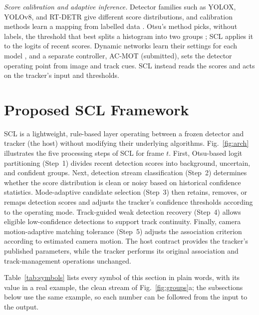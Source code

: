 \documentclass[pdflatex,sn-mathphys-num,iicol]{sn-jnl}
\newcommand{\scl}{SCL}
\begin{document}
\emph{Score calibration and adaptive inference.} Detector families such as YOLOX, YOLOv8, and RT-DETR give different score distributions,
and calibration methods learn a mapping from labelled data \cite{kuppers2020detcalib}. Otsu's
method picks, without labels, the threshold that best splits a histogram into two groups
\cite{otsu1979}; \scl{} applies it to the logits of recent scores. Dynamic networks learn their
settings for each model \cite{han2022dynamic}, and a separate controller, AC-MOT (submitted), sets the detector operating point from
image and track cues. \scl{} instead reads the scores and acts on the tracker's input and
thresholds.
\section{Proposed SCL Framework}\label{sec:method}

\scl{} is a lightweight, rule-based layer operating between a frozen detector and tracker (the
host) without modifying their underlying algorithms. Fig.~\ref{fig:arch} illustrates the five
processing steps of \scl{} for frame $t$. First, Otsu-based logit partitioning (Step~1) divides
recent detection scores into background, uncertain, and confident groups. Next, detection stream
classification (Step~2) determines whether the score distribution is clean or noisy based on
historical confidence statistics. Mode-adaptive candidate selection (Step~3) then retains,
removes, or remaps detection scores and adjusts the tracker's confidence thresholds according to
the operating mode. Track-guided weak detection recovery (Step~4) allows eligible low-confidence
detections to support track continuity. Finally, camera motion-adaptive matching tolerance
(Step~5) adjusts the association criterion according to estimated camera motion. The host
contract provides the tracker's published parameters, while the tracker performs its original
association and track-management operations unchanged.

Table~\ref{tab:symbols} lists every symbol of this section in plain words, with its value in a
real example, the clean stream of Fig.~\ref{fig:groups}a; the subsections below use the same
example, so each number can be followed from the input to the output.
\end{document}
